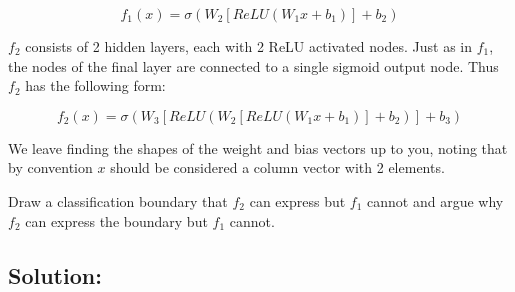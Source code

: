 \documentclass[submit]{harvardml}
\begin{document}
\begin{framed}
\begin{enumerate}
        $$
        f_1(x) = \sigma\left( W_2[ReLU(W_1 x + b_1)] + b_2 \right)
        $$
    
        $f_2$ consists of 2 hidden layers, each with 2 ReLU activated nodes. Just as in $f_1$, the 
        nodes of the final layer are connected to a single sigmoid output node. 
        Thus $f_2$ has the following form:
    
        $$
        f_2(x) = \sigma(W_3[ReLU(W_2[ReLU(W_1 x + b_1)]+b_2)]+ b_3)
        $$
    
        We leave finding the shapes of the weight and bias vectors up to you, noting that 
        by convention $x$ should be considered a column vector with 2 elements. 
    
        Draw a classification boundary that $f_2$ can express but $f_1$ cannot and argue 
        why $f_2$ can express the boundary but $f_1$ cannot.
    
    
    \end{enumerate}  
\end{framed}

\subsection*{Solution:}



\newpage

\end{document}
